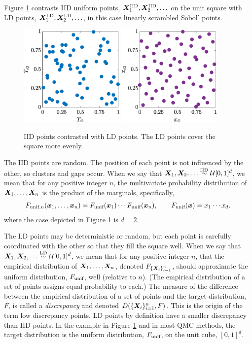 \documentclass[graybox,footinfo]{svmult}
\newcommand{\IID}{\textup{IID}}
\newcommand{\LD}{\textup{LD}}
\newcommand{\unif}{\textup{unif}}
\newcommand{\IIDsim}{\overset{\IID}{\sim}}
\newcommand{\LDsim}{\overset{\LD}{\sim}}
\begin{document}
Figure \ref{fig:comparePts} contrasts IID uniform points, $\bsX^{\IID}_1, \bsX^{\IID}_2, \ldots$  on the unit square  with LD points, $\bsX^{\LD}_1, \bsX^{\LD}_2, \ldots$, in this case linearly scrambled Sobol' points.  
\begin{figure}
	\includegraphics[height=5cm]{ProgramsImages/IIDPoints.eps} \qquad
	\includegraphics[height=5cm]{ProgramsImages/SSobolPoints.eps}
	\caption{IID points contrasted with LD points.  The LD points cover the square more evenly.} \label{fig:comparePts}
\end{figure}
The IID points are random. The position of each point is not influenced by the other, so clusters and gaps occur.  When we say that $\bsX_1, \bsX_2, \ldots \IIDsim \calU[0,1]^d$, we mean that for any positive integer $n$, the  multivariate probability distribution of ${\boldsymbol{X}}_1, \ldots, {\boldsymbol{X}}_n$ is the product of the marginals, specifically,
\begin{equation*}
	F_{\unif,n}(\bsx_1, \ldots, \bsx_n) = F_{\unif}(\bsx_1) \cdots  F_{\unif}(\bsx_n), \qquad F_{\unif}(\bsx) = x_1 \cdots x_d.
\end{equation*}
where the case depicted in Figure \ref{fig:comparePts} is $d = 2$.

The LD points may be deterministic or random, but each point is carefully coordinated with the other so that they fill the square well.  When we say that $\bsX_1, \bsX_2, \ldots \LDsim \calU[0,1]^d$, we mean that for any positive integer $n$, that the empirical distribution of ${\boldsymbol{X}}_1, \ldots, {\boldsymbol{X}}_n$, denoted $F_{\{{\boldsymbol{X}}_i\}_{i=1}^n}$, should approximate the uniform distribution, $F_{\unif}$, well (relative to $n$).  (The empirical distribution of a set of points assigns equal probability to each.)  The measure of the difference between the empirical distribution of a set of points and the target distribution, $F$, is called a \emph{discrepancy} and denoted $D(\{{\boldsymbol{X}}_i\}_{i=1}^n, F)$.  This is the origin of the term low discrepancy points.  LD points by definition have a smaller discrepancy than IID points.  In the example in Figure \ref{fig:comparePts} and in most QMC methods, the target distribution is the uniform distribution, $F_{\unif}$, on the unit cube, $[0,1]^d$.
\end{document}
